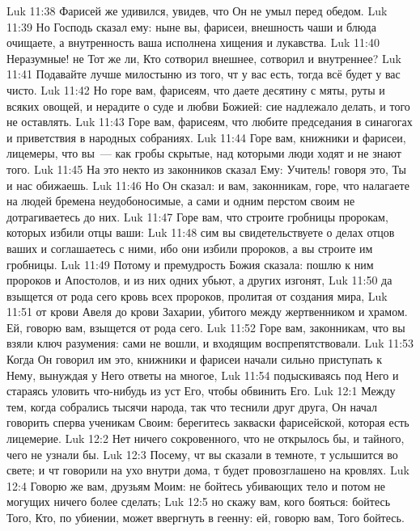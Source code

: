 \vs Luk 11:38 Фарисей же удивился, увидев, что Он не умыл  перед обедом.
\vs Luk 11:39 Но Господь сказал ему: ныне вы, фарисеи, внешность чаши и блюда очищаете, а внутренность ваша исполнена хищения и лукавства.
\vs Luk 11:40 Неразумные! не Тот же ли, Кто сотворил внешнее, сотворил и внутреннее?
\vs Luk 11:41 Подавайте лучше милостыню из того, чт у вас есть, тогда всё будет у вас чисто.
\vs Luk 11:42 Но горе вам, фарисеям, что даете десятину с мяты, руты и всяких овощей, и нерадите о суде и любви Божией: сие надлежало делать, и того не оставлять.
\vs Luk 11:43 Горе вам, фарисеям, что любите председания в синагогах и приветствия в народных собраниях.
\vs Luk 11:44 Горе вам, книжники и фарисеи, лицемеры, что вы~--- как гробы скрытые, над которыми люди ходят и не знают того.
\vs Luk 11:45 На это некто из законников сказал Ему: Учитель! говоря это, Ты и нас обижаешь.
\vs Luk 11:46 Но Он сказал: и вам, законникам, горе, что налагаете на людей бремена неудобоносимые, а сами и одним перстом своим не дотрагиваетесь до них.
\vs Luk 11:47 Горе вам, что строите гробницы пророкам, которых избили отцы ваши:
\vs Luk 11:48 сим вы свидетельствуете о делах отцов ваших и соглашаетесь с ними, ибо они избили пророков, а вы строите им гробницы.
\vs Luk 11:49 Потому и премудрость Божия сказала: пошлю к ним пророков и Апостолов, и из них одних убьют, а других изгонят,
\vs Luk 11:50 да взыщется от рода сего кровь всех пророков, пролитая от создания мира,
\vs Luk 11:51 от крови Авеля до крови Захарии, убитого между жертвенником и храмом. Ей, говорю вам, взыщется от рода сего.
\vs Luk 11:52 Горе вам, законникам, что вы взяли ключ разумения: сами не вошли, и входящим воспрепятствовали.
\vs Luk 11:53 Когда Он говорил им это, книжники и фарисеи начали сильно приступать к Нему, вынуждая у Него ответы на многое,
\vs Luk 11:54 подыскиваясь под Него и стараясь уловить что-нибудь из уст Его, чтобы обвинить Его.
\vs Luk 12:1 Между тем, когда собрались тысячи народа, так что теснили друг друга, Он начал говорить сперва ученикам Своим: берегитесь закваски фарисейской, которая есть лицемерие.
\vs Luk 12:2 Нет ничего сокровенного, что не открылось бы, и тайного, чего не узнали бы.
\vs Luk 12:3 Посему, чт вы сказали в темноте, т услышится во свете; и чт говорили на ухо внутри дома, т будет провозглашено на кровлях.
\vs Luk 12:4 Говорю же вам, друзьям Моим: не бойтесь убивающих тело и потом не могущих ничего более сделать;
\vs Luk 12:5 но скажу вам, кого бояться: бойтесь Того, Кто, по убиении, может ввергнуть в геенну: ей, говорю вам, Того бойтесь.

